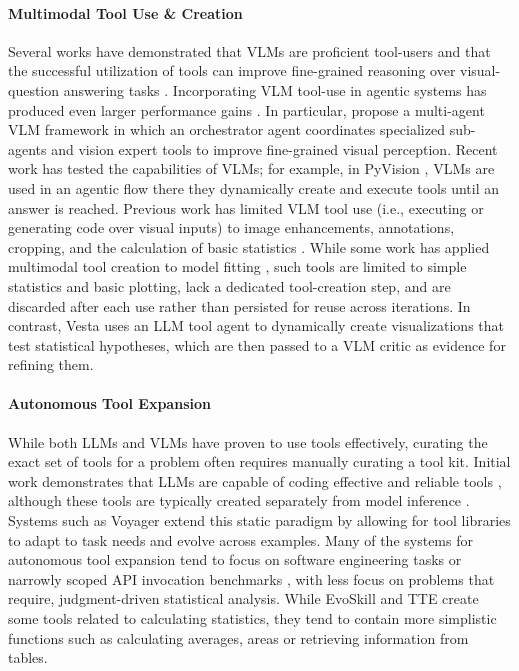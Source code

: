 \documentclass{article}
\newcommand{\method}{{\sc Vesta}}
\begin{document}
\vspace{-0.5em}
\paragraph{Multimodal Tool Use \& Creation} Several works have demonstrated that VLMs are proficient tool-users and that the successful utilization of tools can improve fine-grained reasoning over visual-question answering tasks \citep{visual_sketchpad, image_of_thought, visual_chagpt, vis_mem}. Incorporating VLM tool-use in agentic systems has produced even larger performance gains \citep{skywork, deep_eyes, act_wisely, codev}. In particular, \citet{vipact} propose a multi-agent VLM framework in which an orchestrator agent coordinates specialized sub-agents and vision expert tools to improve fine-grained visual perception. Recent work has tested the capabilities of VLMs; for example, in PyVision \cite{pyvision}, VLMs are used in an agentic flow there they dynamically create and execute tools until an answer is reached. Previous work has limited VLM tool use (i.e., executing or generating code over visual inputs) to image enhancements, annotations, cropping, and the calculation of basic statistics \cite{visual_programming, viper_gpt, visual_perception_w_tools}. While some work has applied multimodal tool creation to model fitting \cite{multimodal_amd}, such tools are limited to simple statistics and basic plotting, lack a dedicated tool-creation step, and are discarded after each use rather than persisted for reuse across iterations. In contrast, \method{} uses an LLM tool agent to dynamically create visualizations that test statistical hypotheses, which are then passed to a VLM critic as evidence for refining them.

\vspace{-0.5em}
\paragraph{Autonomous Tool Expansion} While both LLMs and VLMs have proven to use tools effectively, curating the exact set of tools for a problem often requires manually curating a tool kit. Initial work demonstrates that LLMs are capable of coding effective and reliable tools \cite{creator, latm}, although these tools are typically created separately from model inference \cite{evoskill, tookmaker}. Systems such as Voyager \cite{voyager} extend this static paradigm by allowing for tool libraries to adapt to task needs and evolve across examples. Many of the systems for autonomous tool expansion tend to focus on software engineering tasks \cite{evoclaw, sea-agent, open-sage} or narrowly scoped API invocation benchmarks \cite{toolace, rest-gpt}, with less focus on problems that require, judgment-driven statistical analysis. While EvoSkill \cite{evoskill} and TTE \cite{tte} create some tools related to calculating statistics, they tend to contain more simplistic functions such as calculating averages, areas or retrieving information from tables.   
\end{document}

